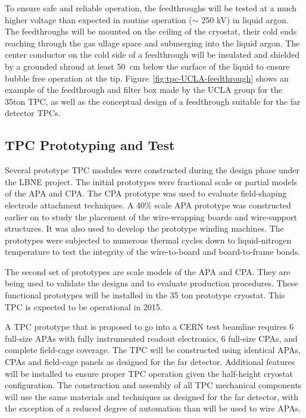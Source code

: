 To ensure safe and reliable operation, the feedthroughs will be tested at a much higher voltage than expected in
routine operation ($\sim$ 250 kV) in liquid argon. The feedthroughs will be mounted on the ceiling of the cryostat, their cold ends reaching 
through the gas ullage space and submerging into the liquid argon. The center conductor on the cold side of a feedthrough will be 
insulated and shielded by a grounded shroud at least 50~cm below the 
surface of the liquid to ensure bubble free operation at the tip. Figure~\ref{fig:tpc-UCLA-feedthrough} shows an example 
of the feedthrough and filter box made by the UCLA group for the 35ton TPC, as well as the conceptual design of a feedthrough suitable for the far detector TPCs.


\subsection{TPC Prototyping and Test}
\label{subsec:fd-ref-tpc-proto}


Several prototype TPC modules were constructed during the design phase under the LBNE project. The initial prototypes were fractional scale or partial models of the APA and CPA. The CPA prototype was used to evaluate field-shaping electrode attachment techniques. A 40\% scale APA prototype was constructed earlier on to study the placement of the wire-wrapping boards and wire-support structures. It was also used to develop the prototype winding machines. The prototypes were subjected to numerous thermal cycles down to liquid-nitrogen temperature to test the integrity of the wire-to-board and board-to-frame bonds. 

The second set of prototypes are scale models of the APA and CPA. They are being used to validate the designs and to evaluate production procedures. These functional prototypes will be installed in the 35 ton prototype cryostat. This TPC is expected to be operational in 2015.

A TPC prototype that is proposed to go into a CERN test beamline requires 6 full-size APAs with fully instrumented readout electronics, 6 full-size CPAs, and complete field-cage coverage. The TPC will be constructed using identical APAs, CPAs and field-cage panels as designed for the far detector. Additional features will be installed to ensure proper TPC operation given the half-height cryostat configuration. The construction and assembly of all TPC mechanical components will use the same materials and techniques as designed for the far detector, with the exception of a reduced degree of automation than will be used to wire APAs.




